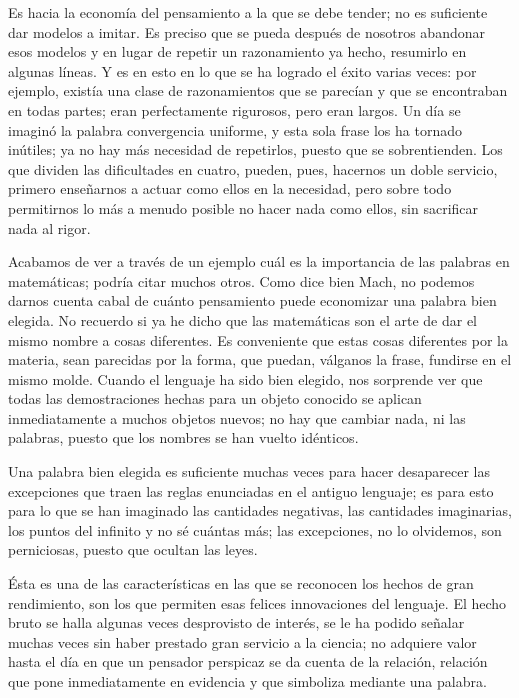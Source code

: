 \documentclass[a4paper, 12pt]{article}
\begin{document}
Es hacia la economía del pensamiento a la que se debe tender; no es
suficiente dar modelos a imitar. Es preciso que se pueda después de
nosotros abandonar esos modelos y en lugar de repetir un razonamiento ya
hecho, resumirlo en algunas líneas. Y es en esto en lo que se ha
logrado el éxito varias veces: por ejemplo, existía una clase de
razonamientos que se parecían y que se encontraban en todas partes;
eran perfectamente rigurosos, pero eran largos. Un día se imaginó
la palabra convergencia uniforme, y esta sola frase los ha tornado
inútiles; ya no hay más necesidad de repetirlos, puesto que se
sobrentienden. Los que dividen las dificultades en cuatro, pueden, pues,
hacernos un doble servicio, primero enseñarnos a actuar como ellos en la
necesidad, pero sobre todo permitirnos lo más a menudo posible no hacer
nada como ellos, sin sacrificar nada al rigor.

Acabamos de ver a través de un ejemplo cuál es la importancia de las
palabras en matemáticas; podría citar muchos otros. Como dice bien
Mach, no podemos darnos cuenta cabal de cuánto pensamiento puede
economizar una palabra bien elegida. No recuerdo si ya he dicho que las matemáticas son el arte de dar el mismo nombre a cosas diferentes. Es conveniente que
estas cosas diferentes por la materia, sean parecidas por la forma, que
puedan, válganos la frase, fundirse en el mismo molde. Cuando el
lenguaje ha sido bien elegido, nos sorprende ver que todas las
demostraciones hechas para un objeto conocido se aplican inmediatamente a
muchos objetos nuevos; no hay que cambiar nada, ni las palabras, puesto que
los nombres se han vuelto idénticos.

Una palabra bien elegida es suficiente muchas veces para hacer desaparecer las excepciones que traen las reglas enunciadas en el antiguo lenguaje; es
para esto para lo que se han imaginado las cantidades negativas, las
cantidades imaginarias, los puntos del infinito y no sé cuántas más; las excepciones, no lo olvidemos, son perniciosas, puesto que
ocultan las leyes.

Ésta es una de las características en las que se reconocen los
hechos de gran rendimiento, son los que permiten esas felices innovaciones
del lenguaje. El hecho bruto se halla algunas veces desprovisto de interés, se le ha podido señalar muchas veces sin haber prestado gran servicio
a la ciencia; no adquiere valor hasta el día en que un pensador
perspicaz se da cuenta de la relación, relación que pone
inmediatamente en evidencia y que simboliza mediante una palabra.
\end{document}
